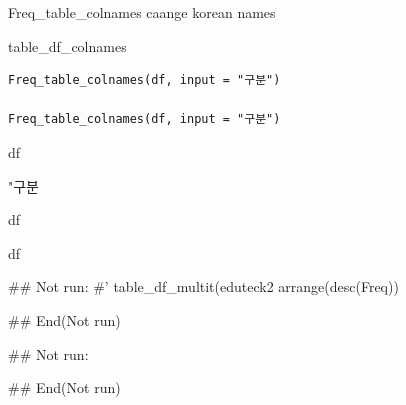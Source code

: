 \documentclass[a4paper]{book}
\begin{document}
%
\begin{Description}
Freq\_table\_colnames caange korean names

table\_df\_colnames
\end{Description}
%
\begin{Usage}
\begin{verbatim}
Freq_table_colnames(df, input = "구분")

Freq_table_colnames(df, input = "구분")
\end{verbatim}
\end{Usage}
%
\begin{Arguments}
\begin{ldescription}
\item[\code{df}] df

\item[\code{input}] "구분
\end{ldescription}
\end{Arguments}
%
\begin{Value}
df

df
\end{Value}
%
\begin{Examples}
\begin{ExampleCode}
\#\# Not run: 
#' table_df_multit(eduteck2 %
arrange(desc(Freq)) %

## End(Not run)

\#\# Not run: 



## End(Not run)
\end{ExampleCode}
\end{Examples}
\end{document}
